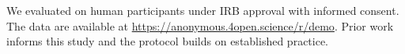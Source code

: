 \documentclass{article}
\author{Anonymous Authors}
\begin{document}
We evaluated on human participants under IRB approval with informed consent.
The data are available at \url{https://anonymous.4open.science/r/demo}.
Prior work informs this study and the protocol builds on established practice.
\end{document}
